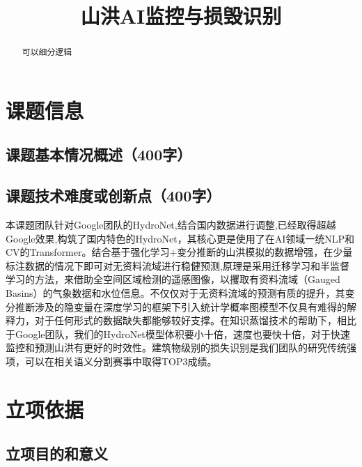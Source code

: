 \documentclass{ctexart}
\title{山洪AI监控与损毁识别}
\begin{document}
\maketitle

\begin{abstract}
    可以细分逻辑
\end{abstract}


\section{课题信息}
\subsection{课题基本情况概述（400字）}
\subsection{课题技术难度或创新点（400字）}


本课题团队针对Google团队的HydroNet,结合国内数据进行调整,已经取得超越Google效果,构筑了国内特色的HydroNet，其核心更是使用了在AI领域一统NLP和CV的Transformer。结合基于强化学习+变分推断的山洪模拟的数据增强，在少量标注数据的情况下即可对无资料流域进行稳健预测,原理是采用迁移学习和半监督学习的方法，来借助全空间区域检测的遥感图像，以攫取有资料流域（Gauged Basins）的气象数据和水位信息。不仅仅对于无资料流域的预测有质的提升，其变分推断涉及的隐变量在深度学习的框架下引入统计学概率图模型不仅具有难得的解释力，对于任何形式的数据缺失都能够较好支撑。在知识蒸馏技术的帮助下，相比于Google团队，我们的HydroNet模型体积要小十倍，速度也要快十倍，对于快速监控和预测山洪有更好的时效性。建筑物级别的损失识别是我们团队的研究传统强项，可以在相关语义分割赛事中取得TOP3成绩。





\section{立项依据}


\subsection{立项目的和意义}
\end{document}
